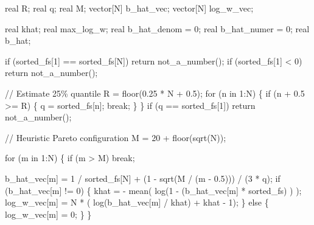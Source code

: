 \documentclass[
  letterpaper,
  DIV=11,
  numbers=noendperiod]{scrartcl}
\newenvironment{Shaded}{\begin{snugshade}}{\end{snugshade}}
\newcommand{\CommentTok}[1]{\textcolor[rgb]{0.37,0.37,0.37}{#1}}
\newcommand{\ControlFlowTok}[1]{\textcolor[rgb]{0.00,0.23,0.31}{#1}}
\newcommand{\DataTypeTok}[1]{\textcolor[rgb]{0.68,0.00,0.00}{#1}}
\newcommand{\DecValTok}[1]{\textcolor[rgb]{0.68,0.00,0.00}{#1}}
\newcommand{\FloatTok}[1]{\textcolor[rgb]{0.68,0.00,0.00}{#1}}
\newcommand{\NormalTok}[1]{\textcolor[rgb]{0.00,0.23,0.31}{#1}}
\begin{document}
\begin{codelisting}
\begin{Shaded}
\begin{Highlighting}[]
    \DataTypeTok{real}\NormalTok{ R;}
    \DataTypeTok{real}\NormalTok{ q;}
    \DataTypeTok{real}\NormalTok{ M;}
    \DataTypeTok{vector}\NormalTok{[N] b\_hat\_vec;}
    \DataTypeTok{vector}\NormalTok{[N] log\_w\_vec;}

    \DataTypeTok{real}\NormalTok{ khat;}
    \DataTypeTok{real}\NormalTok{ max\_log\_w;}
    \DataTypeTok{real}\NormalTok{ b\_hat\_denom = }\DecValTok{0}\NormalTok{;}
    \DataTypeTok{real}\NormalTok{ b\_hat\_numer = }\DecValTok{0}\NormalTok{;}
    \DataTypeTok{real}\NormalTok{ b\_hat;}

    \ControlFlowTok{if}\NormalTok{ (sorted\_fs[}\DecValTok{1}\NormalTok{] == sorted\_fs[N]) }\ControlFlowTok{return}\NormalTok{ not\_a\_number();}
    \ControlFlowTok{if}\NormalTok{ (sorted\_fs[}\DecValTok{1}\NormalTok{] \textless{} }\DecValTok{0}\NormalTok{) }\ControlFlowTok{return}\NormalTok{ not\_a\_number();}

    \CommentTok{// Estimate 25\% quantile}
\NormalTok{    R = floor(}\FloatTok{0.25}\NormalTok{ * N + }\FloatTok{0.5}\NormalTok{);}
    \ControlFlowTok{for}\NormalTok{ (n }\ControlFlowTok{in} \DecValTok{1}\NormalTok{:N) \{}
      \ControlFlowTok{if}\NormalTok{ (n + }\FloatTok{0.5}\NormalTok{ \textgreater{}= R) \{}
\NormalTok{        q = sorted\_fs[n];}
        \ControlFlowTok{break}\NormalTok{;}
\NormalTok{      \}}
\NormalTok{    \}}
    \ControlFlowTok{if}\NormalTok{ (q == sorted\_fs[}\DecValTok{1}\NormalTok{]) }\ControlFlowTok{return}\NormalTok{ not\_a\_number();}

    \CommentTok{// Heuristic Pareto configuration}
\NormalTok{    M = }\DecValTok{20}\NormalTok{ + floor(sqrt(N));}

    \ControlFlowTok{for}\NormalTok{ (m }\ControlFlowTok{in} \DecValTok{1}\NormalTok{:N) \{}
      \ControlFlowTok{if}\NormalTok{ (m \textgreater{} M) }\ControlFlowTok{break}\NormalTok{;}

\NormalTok{      b\_hat\_vec[m] = }\DecValTok{1}\NormalTok{ / sorted\_fs[N] + (}\DecValTok{1}\NormalTok{ {-} sqrt(M / (m {-} }\FloatTok{0.5}\NormalTok{))) / (}\DecValTok{3}\NormalTok{ * q);}
      \ControlFlowTok{if}\NormalTok{ (b\_hat\_vec[m] != }\DecValTok{0}\NormalTok{) \{}
\NormalTok{        khat = {-} mean( log(}\DecValTok{1}\NormalTok{ {-} (b\_hat\_vec[m] * sorted\_fs) ) );}
\NormalTok{        log\_w\_vec[m] = N * ( log(b\_hat\_vec[m] / khat) + khat {-} }\DecValTok{1}\NormalTok{);}
\NormalTok{      \} }\ControlFlowTok{else}\NormalTok{ \{}
\NormalTok{        log\_w\_vec[m] = }\DecValTok{0}\NormalTok{;}
\NormalTok{      \}}
\NormalTok{    \}}


\end{Highlighting}
\end{Shaded}
\end{codelisting}
\end{document}
